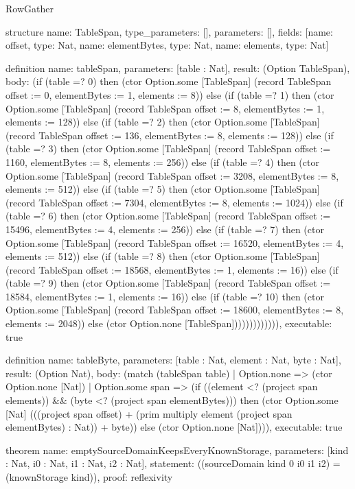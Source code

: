 \begin{lexlean}{RowGather}
\begin{semanticmodule}
structure{
  name: TableSpan,
  type_parameters: [],
  parameters: [],
  fields: [{name: offset, type: Nat}, {name: elementBytes, type: Nat}, {name: elements, type: Nat}]
}

definition{
  name: tableSpan,
  parameters: [table : Nat],
  result: (Option TableSpan),
  body: (if (table =? 0) then (ctor Option.some [TableSpan] (record TableSpan {offset := 0, elementBytes := 1, elements := 8})) else (if (table =? 1) then (ctor Option.some [TableSpan] (record TableSpan {offset := 8, elementBytes := 1, elements := 128})) else (if (table =? 2) then (ctor Option.some [TableSpan] (record TableSpan {offset := 136, elementBytes := 8, elements := 128})) else (if (table =? 3) then (ctor Option.some [TableSpan] (record TableSpan {offset := 1160, elementBytes := 8, elements := 256})) else (if (table =? 4) then (ctor Option.some [TableSpan] (record TableSpan {offset := 3208, elementBytes := 8, elements := 512})) else (if (table =? 5) then (ctor Option.some [TableSpan] (record TableSpan {offset := 7304, elementBytes := 8, elements := 1024})) else (if (table =? 6) then (ctor Option.some [TableSpan] (record TableSpan {offset := 15496, elementBytes := 4, elements := 256})) else (if (table =? 7) then (ctor Option.some [TableSpan] (record TableSpan {offset := 16520, elementBytes := 4, elements := 512})) else (if (table =? 8) then (ctor Option.some [TableSpan] (record TableSpan {offset := 18568, elementBytes := 1, elements := 16})) else (if (table =? 9) then (ctor Option.some [TableSpan] (record TableSpan {offset := 18584, elementBytes := 1, elements := 16})) else (if (table =? 10) then (ctor Option.some [TableSpan] (record TableSpan {offset := 18600, elementBytes := 8, elements := 2048})) else (ctor Option.none [TableSpan])))))))))))),
  executable: true
}

definition{
  name: tableByte,
  parameters: [table : Nat, element : Nat, byte : Nat],
  result: (Option Nat),
  body: (match (tableSpan table)
    | Option.none => (ctor Option.none [Nat])
    | Option.some span => (if ((element <? (project span elements)) && (byte <? (project span elementBytes))) then (ctor Option.some [Nat] (((project span offset) + (prim multiply element (project span elementBytes) : Nat)) + byte)) else (ctor Option.none [Nat]))),
  executable: true
}

theorem{
  name: emptySourceDomainKeepsEveryKnownStorage,
  parameters: [kind : Nat, i0 : Nat, i1 : Nat, i2 : Nat],
  statement: ((sourceDomain kind 0 i0 i1 i2) = (knownStorage kind)),
  proof: reflexivity{}
}


\end{semanticmodule}
\end{lexlean}
